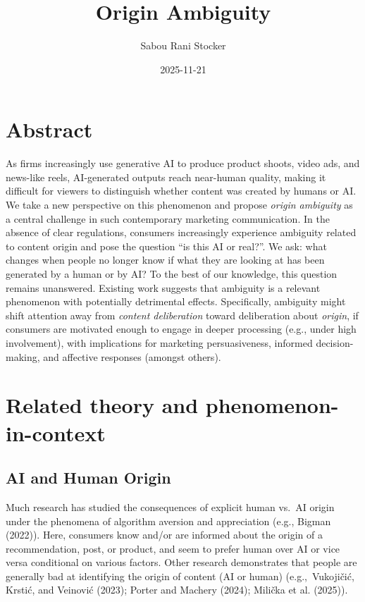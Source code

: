 \documentclass[
  letterpaper,
  DIV=11,
  numbers=noendperiod]{scrartcl}
\title{Origin Ambiguity}
\author{Sabou Rani Stocker}
\date{2025-11-21}
\begin{document}
\maketitle


\section{Abstract}\label{abstract}

As firms increasingly use generative AI to produce product shoots, video
ads, and news-like reels, AI-generated outputs reach near-human quality,
making it difficult for viewers to distinguish whether content was
created by humans or AI. We take a new perspective on this phenomenon
and propose \emph{origin ambiguity} as a central challenge in such
contemporary marketing communication. In the absence of clear
regulations, consumers increasingly experience ambiguity related to
content origin and pose the question ``is this AI or real?''. We ask:
what changes when people no longer know if what they are looking at has
been generated by a human or by AI? To the best of our knowledge, this
question remains unanswered. Existing work suggests that ambiguity is a
relevant phenomenon with potentially detrimental effects. Specifically,
ambiguity might shift attention away from \emph{content deliberation}
toward deliberation about \emph{origin}, if consumers are motivated
enough to engage in deeper processing (e.g., under high involvement),
with implications for marketing persuasiveness, informed
decision-making, and affective responses (amongst others).

\section{Related theory and
phenomenon-in-context}\label{related-theory-and-phenomenon-in-context}

\subsection{AI and Human Origin}\label{ai-and-human-origin}

Much research has studied the consequences of explicit human vs.~AI
origin under the phenomena of algorithm aversion and appreciation (e.g.,
Bigman (2022)). Here, consumers know and/or are informed about the
origin of a recommendation, post, or product, and seem to prefer human
over AI or vice versa conditional on various factors. Other research
demonstrates that people are generally bad at identifying the origin of
content (AI or human) (e.g.,~Vukojičić, Krstić, and Veinović (2023);
Porter and Machery (2024); Milička et al. (2025)).
\end{document}
